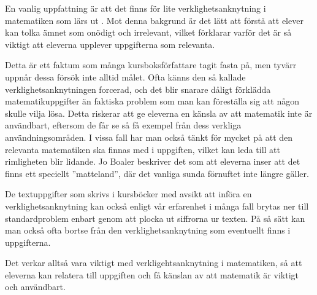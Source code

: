 \textcolor{lila}{En vanlig uppfattning är att det finns för lite verklighetsanknytning i matematiken som lärs ut \cite{TheElephant}. Mot denna bakgrund är det lätt att förstå att elever kan tolka ämnet som onödigt och irrelevant, vilket förklarar varför det är så viktigt att eleverna upplever uppgifterna som relevanta.}

\textcolor{lila}{Detta är ett faktum som många kursboksförfattare tagit fasta på, men tyvärr uppnår dessa försök inte alltid målet. Ofta känns den så kallade verklighetsanknytningen forcerad, och det blir snarare dåligt förklädda matematikuppgifter än faktiska problem som man kan föreställa sig att någon skulle vilja lösa. Detta riskerar att ge eleverna en känsla av att matematik inte är användbart, eftersom de får se så få exempel från dess verkliga användningsområden.
I vissa fall har man också tänkt för mycket på att den relevanta matematiken ska finnas med i uppgiften, vilket kan leda till att rimligheten blir lidande. Jo Boaler beskriver det som att eleverna inser att det finns ett speciellt ''matteland'', där det vanliga sunda förnuftet inte längre gäller. \cite{TheElephant}}
    
\textcolor{lila}{De textuppgifter som skrivs  i kursböcker med avsikt att införa en verklighetsanknytning kan också enligt vår erfarenhet i många fall brytas ner till standardproblem enbart genom att plocka ut siffrorna ur texten. På så sätt kan man också ofta bortse från den verklighetsanknytning som eventuellt finns i uppgifterna.}

\textcolor{lila}{Det verkar alltså vara viktigt med verkligehtsanknytning i matematiken, så att eleverna kan relatera till uppgiften och få känslan av att matematik är viktigt och användbart.}